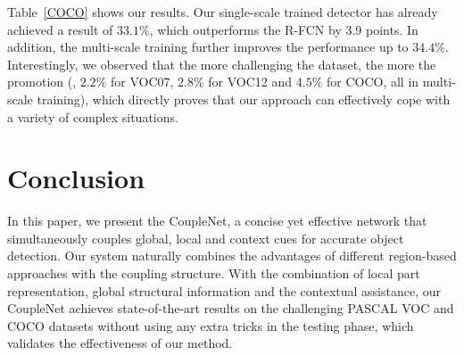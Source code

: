 \documentclass[10pt,twocolumn,letterpaper]{article}
\begin{document}
Table~\ref{COCO} shows our results. Our single-scale trained detector has already achieved a result of $33.1\%$, which outperforms the R-FCN by 3.9 points. In addition, the multi-scale training further improves the performance up to $34.4\%$. Interestingly, we observed that the more challenging the dataset, the more the promotion (\eg, $2.2\%$ for VOC07, $2.8\%$ for VOC12 and $4.5\%$ for COCO, all in multi-scale training), which directly proves that our approach can effectively cope with a variety of complex situations.

\section{Conclusion}
In this paper, we present the CoupleNet, a concise yet effective network that simultaneously couples global, local and context cues for accurate object detection.
Our system naturally combines the advantages of different region-based approaches with the coupling structure. With the combination of local part representation, global structural information and the contextual assistance, our CoupleNet achieves state-of-the-art results on the challenging PASCAL VOC and COCO datasets without using any extra tricks in the testing phase, which validates the effectiveness of our method.

{\small


}
\end{document}
